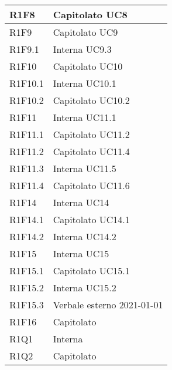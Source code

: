 \begin{center}
\begin{longtable}{|p{22mm}|p{22mm}|}
	\hline
R1F8	& 
	Capitolato \newline
	UC8
\\
\hline	
R1F9	& 
	Capitolato \newline
	UC9
\\
\hline	
R1F9.1	& 
	Interna \newline
	UC9.3
\\
\hline
R1F10	& 
	Capitolato \newline
	UC10
\\
\hline
R1F10.1	& 
	Interna \newline
	UC10.1
\\
\hline	
R1F10.2	& 
	Capitolato \newline
	UC10.2
\\
\hline
R1F11	& 
	Interna \newline
	UC11.1
\\
\hline
R1F11.1	& 
	Capitolato \newline
	UC11.2
\\
\hline
R1F11.2	& 
	Capitolato \newline
	UC11.4
\\
\hline
R1F11.3	& 
	Interna \newline
	UC11.5
\\
\hline
R1F11.4	& 
	Capitolato \newline
	UC11.6
\\
\hline
R1F14	& 
		Interna \newline
		UC14
\\
	\hline
R1F14.1	& 
		Capitolato \newline
		UC14.1 \\
	\hline
R1F14.2	& 
		Interna \newline
		UC14.2
\\
	\hline
R1F15	& 
		Interna \newline
		UC15
\\
	\hline
R1F15.1		& 
	Capitolato \newline
	UC15.1	
	\\
	\hline
R1F15.2	& 
	Interna \newline
	UC15.2	
	\\
	
	\hline
R1F15.3	& Verbale esterno 2021-01-01 \\
	\hline
	R1F16	& Capitolato\\
	\hline
R1Q1	& Interna\\
	\hline
	R1Q2	& Capitolato\\
	\hline


\end{longtable}
\end{center}
